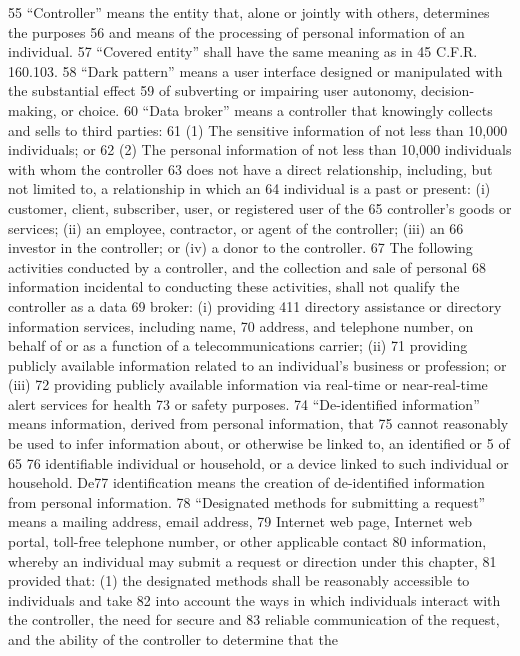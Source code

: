 55 “Controller” means the entity that, alone or jointly with others, determines the purposes
56 and means of the processing of personal information of an individual.
57 “Covered entity” shall have the same meaning as in 45 C.F.R. 160.103.
58 “Dark pattern” means a user interface designed or manipulated with the substantial effect
59 of subverting or impairing user autonomy, decision-making, or choice.
60 “Data broker” means a controller that knowingly collects and sells to third parties:
61 (1) The sensitive information of not less than 10,000 individuals; or
62 (2) The personal information of not less than 10,000 individuals with whom the controller
63 does not have a direct relationship, including, but not limited to, a relationship in which an
64 individual is a past or present: (i) customer, client, subscriber, user, or registered user of the
65 controller’s goods or services; (ii) an employee, contractor, or agent of the controller; (iii) an
66 investor in the controller; or (iv) a donor to the controller.
67 The following activities conducted by a controller, and the collection and sale of personal
68 information incidental to conducting these activities, shall not qualify the controller as a data
69 broker: (i) providing 411 directory assistance or directory information services, including name,
70 address, and telephone number, on behalf of or as a function of a telecommunications carrier; (ii)
71 providing publicly available information related to an individual’s business or profession; or (iii)
72 providing publicly available information via real-time or near-real-time alert services for health
73 or safety purposes.
74 “De-identified information” means information, derived from personal information, that
75 cannot reasonably be used to infer information about, or otherwise be linked to, an identified or
5 of 65
76 identifiable individual or household, or a device linked to such individual or household. De77 identification means the creation of de-identified information from personal information.
78 “Designated methods for submitting a request” means a mailing address, email address,
79 Internet web page, Internet web portal, toll-free telephone number, or other applicable contact
80 information, whereby an individual may submit a request or direction under this chapter,
81 provided that: (1) the designated methods shall be reasonably accessible to individuals and take
82 into account the ways in which individuals interact with the controller, the need for secure and
83 reliable communication of the request, and the ability of the controller to determine that the

